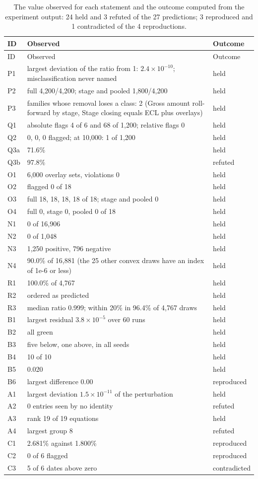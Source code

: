 \begin{longtable}{lp{9.2cm}l}
\caption{The value observed for each statement and the outcome computed from the experiment output: 24 held and 3 refuted of the 27 predictions; 3 reproduced and 1 contradicted of the 4 reproductions.}\label{tab:outcomes}\\
\toprule
ID & Observed & Outcome \\
\midrule
\endfirsthead
\toprule
ID & Observed & Outcome \\
\midrule
\endhead
\bottomrule
\endfoot
P1 & largest deviation of the ratio from 1: $2.4\times10^{-10}$; misclassification never named & held \\
P2 & full 4,200/4,200; stage and pooled 1,800/4,200 & held \\
P3 & families whose removal loses a class: 2 (Gross amount roll-forward by stage, Stage closing equals ECL plus overlays) & held \\
Q1 & absolute flags 4 of 6 and 68 of 1,200; relative flags 0 & held \\
Q2 & 0, 0, 0 flagged; at 10,000: 1 of 1,200 & held \\
Q3a & 71.6\% & held \\
Q3b & 97.8\% & refuted \\
O1 & 6,000 overlay sets, violations 0 & held \\
O2 & flagged 0 of 18 & held \\
O3 & full 18, 18, 18, 18 of 18; stage and pooled 0 & held \\
O4 & full 0, stage 0, pooled 0 of 18 & held \\
N1 & 0 of 16,906 & held \\
N2 & 0 of 1,048 & held \\
N3 & 1,250 positive, 796 negative & held \\
N4 & 90.0\% of 16,881 (the 25 other convex draws have an index of 1e-6 or less) & held \\
R1 & 100.0\% of 4,767 & held \\
R2 & ordered as predicted & held \\
R3 & median ratio 0.999; within 20\% in 96.4\% of 4,767 draws & held \\
B1 & largest residual $3.8\times10^{-5}$ over 60 runs & held \\
B2 & all green & held \\
B3 & five below, one above, in all seeds & held \\
B4 & 10 of 10 & held \\
B5 & 0.020 & held \\
B6 & largest difference 0.00 & reproduced \\
A1 & largest deviation $1.5\times10^{-11}$ of the perturbation & held \\
A2 & 0 entries seen by no identity & refuted \\
A3 & rank 19 of 19 equations & held \\
A4 & largest group 8 & refuted \\
C1 & 2.681\% against 1.800\% & reproduced \\
C2 & 0 of 6 flagged & reproduced \\
C3 & 5 of 6 dates above zero & contradicted \\
\end{longtable}
